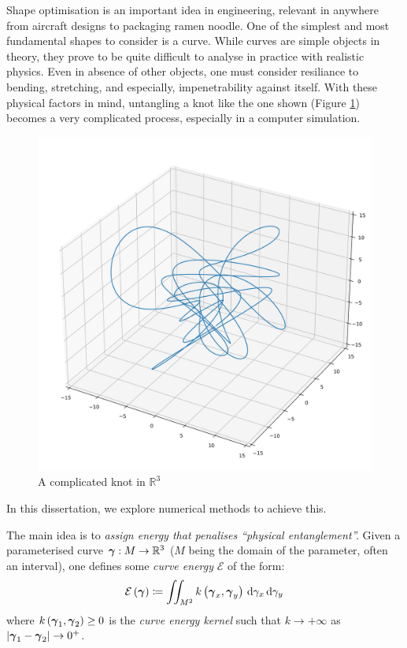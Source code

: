 \documentclass[../dissertation.tex]{subfiles}
\begin{document}
Shape optimisation is an important idea in engineering, relevant in anywhere from aircraft designs to packaging ramen noodle.
One of the simplest and most fundamental shapes to consider is a curve.
While curves are simple objects in theory, they prove to be quite difficult to analyse in practice with realistic physics.
Even in absence of other objects, one must consider resiliance to bending, stretching, and especially, impenetrability against itself.
With these physical factors in mind, untangling a knot like the one shown (Figure \ref{fig: Knot}) becomes a very complicated process,
especially in a computer simulation.
\begin{figure}[tpb]
    \centering
    \includegraphics[scale=0.3]{sections/introductionImgs/knot}
    \caption{A complicated knot in $\mathbb{R}^3$}
    \label{fig: Knot}
\end{figure}
In this dissertation, we explore numerical methods to achieve this.

The main idea is to \emph{assign energy that penalises ``physical entanglement''.}
Given a parameterised curve $\boldsymbol{\gamma}:M \rightarrow \mathbb{R}^3$ ($M$ being the domain of the parameter, often an interval),
one defines some \emph{curve energy} $\mathcal{E}$ of the form:
\begin{equation}
    \mathcal{E} \left( \boldsymbol{\gamma} \right) \coloneqq \iint_{M^2} k\left( \boldsymbol{\gamma}_x, \boldsymbol{\gamma}_y \right) \, \text{d} \gamma_x \, \text{d} \gamma_y
\end{equation}
where $k\left( \boldsymbol{\gamma}_1, \boldsymbol{\gamma}_2 \right) \geq 0$ is the \emph{curve energy kernel} such that $k \rightarrow +\infty$ as $\abs{\gammabf_1 - \gammabf_2} \rightarrow 0^+$.
\end{document}
